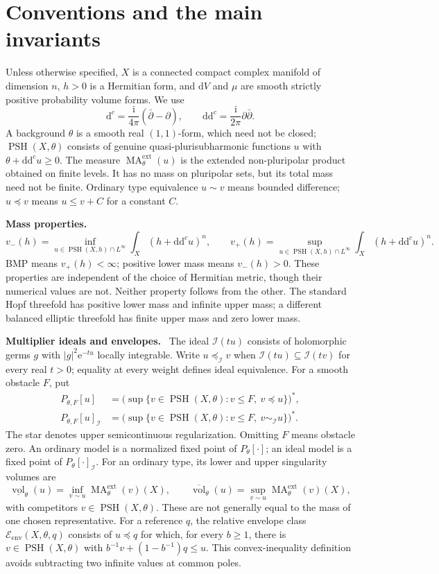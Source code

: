 \documentclass[11pt]{article}
\newcommand{\ddc}{\mathrm d\mathrm d^c}
\newcommand{\dc}{\mathrm d^c}
\newcommand{\PSH}{\operatorname{PSH}}
\newcommand{\MA}{\operatorname{MA}^{\mathrm{ext}}}
\newcommand{\field}[1]{\par\medskip\noindent\textbf{#1.}\ }
\begin{document}
\section{Conventions and the main invariants}
Unless otherwise specified, $X$ is a connected compact complex manifold of dimension $n$, $h>0$ is a Hermitian form, and $\mathrm dV$ and $\mu$ are smooth strictly positive probability volume forms. We use
\[\dc=\frac{\mathrm i}{4\pi}(\bar\partial-\partial),\qquad
 \ddc=\frac{\mathrm i}{2\pi}\partial\bar\partial.\]
A background $\theta$ is a smooth real $(1,1)$-form, which need not be closed; $\PSH(X,\theta)$ consists of genuine quasi-plurisubharmonic functions $u$ with $\theta+\ddc u\geq0$. The measure $\MA_\theta(u)$ is the extended non-pluripolar product obtained on finite levels. It has no mass on pluripolar sets, but its total mass need not be finite. Ordinary type equivalence $u\sim v$ means bounded difference; $u\preceq v$ means $u\leq v+C$ for a constant $C$.

\field{Mass properties}
\[v_-(h)=\inf_{u\in\PSH(X,h)\cap L^\infty}\int_X(h+\ddc u)^n,
 \qquad
 v_+(h)=\sup_{u\in\PSH(X,h)\cap L^\infty}\int_X(h+\ddc u)^n.\]
BMP means $v_+(h)<\infty$; positive lower mass means $v_-(h)>0$. These properties are independent of the choice of Hermitian metric, though their numerical values are not. Neither property follows from the other. The standard Hopf threefold has positive lower mass and infinite upper mass; a different balanced elliptic threefold has finite upper mass and zero lower mass.

\field{Multiplier ideals and envelopes}
The ideal $\mathcal I(tu)$ consists of holomorphic germs $g$ with $|g|^2\mathrm e^{-tu}$ locally integrable. Write $u\preceq_{\mathcal I}v$ when $\mathcal I(tu)\subseteq\mathcal I(tv)$ for every real $t>0$; equality at every weight defines ideal equivalence. For a smooth obstacle $F$, put
\[
\begin{split}
P_{\theta,F}[u]&=\bigl(\sup\{v\in\PSH(X,\theta):v\leq F,\ v\preceq u\}\bigr)^*,\\
P_{\theta,F}[u]_{\mathcal I}&=\bigl(\sup\{v\in\PSH(X,\theta):v\leq F,\ v\sim_{\mathcal I}u\}\bigr)^*.
\end{split}
\]
The star denotes upper semicontinuous regularization. Omitting $F$ means obstacle zero. An ordinary model is a normalized fixed point of $P_\theta[\cdot]$; an ideal model is a fixed point of $P_\theta[\cdot]_{\mathcal I}$. For an ordinary type, its lower and upper singularity volumes are
\[\underline{\operatorname{vol}}_\theta(u)=\inf_{v\sim u}\MA_\theta(v)(X),\qquad
\overline{\operatorname{vol}}_\theta(u)=\sup_{v\sim u}\MA_\theta(v)(X),\]
with competitors $v\in\PSH(X,\theta)$. These are not generally equal to the mass of one chosen representative. For a reference $q$, the relative envelope class $\mathcal E_{\mathrm{env}}(X,\theta,q)$ consists of $u\preceq q$ for which, for every $b\geq1$, there is $v\in\PSH(X,\theta)$ with $b^{-1}v+(1-b^{-1})q\leq u$. This convex-inequality definition avoids subtracting two infinite values at common poles.
\end{document}
